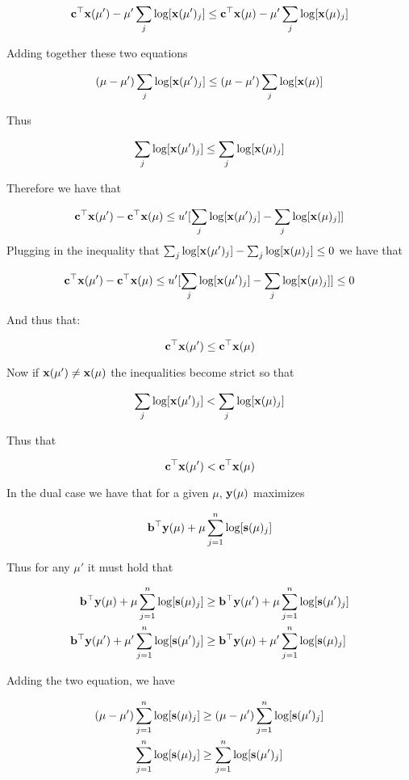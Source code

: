 \documentclass[answers]{exam} %
\renewcommand\b{{\bf b}}
\newcommand\x{{\bf x}}
\newcommand\cc{{\bf c}}
\renewcommand\b{{\bf b}}
\newcommand\y{{\bf y}}
\newcommand\s{{\bf s}}
\begin{document}
\begin{itemize}
\begin{framed}
\[
\cc^{\top} \x(\mu') - \mu' \sum_{j} \log[\x(\mu')_j] \leq \cc^{\top} \x(\mu) - \mu' \sum_{j} \log[\x(\mu)_j] 
\]

Adding together these two equations 

\[
(\mu - \mu') \sum_{j} \log[\x(\mu')_j] \leq (\mu - \mu') \sum_{j} \log[\x(\mu)]
\]

Thus 

\[
\sum_{j} \log[\x(\mu')_j] \leq \sum_{j} \log[\x(\mu)_j]
\]

Therefore we have that 

\[
\cc^{\top} \x(\mu') - \cc^{\top} \x(\mu) \leq u'[ \sum_j \log[\x(\mu')_j] - \sum_j \log[\x(\mu)_j]]  
\]
Plugging in the inequality that $\sum_{j} \log[\x(\mu')_j] - \sum_{j} \log[\x(\mu)_j] \leq 0$ we have that 

\[
\cc^{\top} \x(\mu') - \cc^{\top} \x(\mu) \leq u'[ \sum_j \log[\x(\mu')_j] - \sum_j \log[\x(\mu)_j]] \leq 0
\]

And thus that:

\[
\cc^{\top} \x(\mu') \leq \cc^{\top} \x(\mu)
\]

Now if $\x(\mu') \neq \x(\mu)$ the inequalities become strict so that 


\[
\sum_{j} \log[\x(\mu')_j]  < \sum_{j} \log[\x(\mu)_j]
\]


Thus that 

\[
\cc^{\top} \x(\mu')  < \cc^{\top} \x(\mu)
\]

In the dual case we have that for a given $\mu$, $\y(\mu)$ maximizes 


\[
\b^{\top} \y(\mu)  + \mu \sum_{j=1}^{n} \log[\s(\mu)_j]
\]

Thus for any $\mu'$ it must hold that 


\begin{equation*}
\begin{aligned}
\b^{\top} \y(\mu)  + \mu \sum_{j=1}^{n} \log[\s(\mu)_j] &\geq \b^{\top} \y(\mu')  + \mu \sum_{j=1}^{n} \log[\s(\mu')_j] \\
\b^{\top} \y(\mu')  + \mu' \sum_{j=1}^{n} \log[\s(\mu')_j] &\geq \b^{\top} \y(\mu)  + \mu' \sum_{j=1}^{n} \log[\s(\mu
)_j] 
\end{aligned}
\end{equation*}

Adding the two equation, we have

\begin{equation*}
\begin{aligned}
(\mu - \mu') \sum_{j=1}^{n} \log[\s(\mu)_j]  &\geq  (\mu - \mu') \sum_{j=1}^{n} \log[\s(\mu')_j] \\ 
 \sum_{j=1}^{n} \log[\s(\mu)_j]  &\geq   \sum_{j=1}^{n} \log[\s(\mu')_j]
\end{aligned}
\end{equation*}


\end{framed}
\end{itemize}
\end{document}
